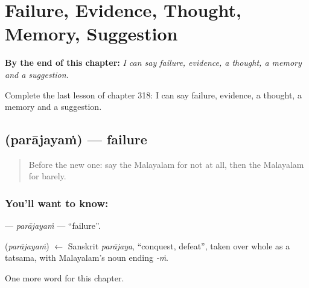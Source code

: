 
\chapter{Failure, Evidence, Thought, Memory, Suggestion}
\label{ch:ml-failure-evidence-thought-memory-suggestion}

\begin{chapteropening}
\textbf{By the end of this chapter:} \emph{I can say failure, evidence, a thought, a memory and a suggestion.}

Complete the last lesson of chapter 318: I can say failure, evidence, a thought, a memory and a suggestion.
\end{chapteropening}

\section[\texorpdfstring{\ml{പരാജയം} (parājayaṁ)}{പരാജയം (parājayaṁ)}]{ (parājayaṁ) — failure}

\label{lesson:ML-C318-parajayam}



\begin{quote}
Before the new one: say the Malayalam for not at all, then the Malayalam for barely.
\end{quote}

\subsection*{You'll want to know: }
\textbf{} — \emph{parājayaṁ} — \textquotedblleft{}failure\textquotedblright{}.

\begin{cousinweb}
\textbf{} (\emph{parājayaṁ}) $\leftarrow$ Sanskrit \emph{parājaya}, \textquotedblleft{}conquest, defeat\textquotedblright{}, taken over whole as a tatsama, with Malayalam's noun ending \emph{-ṁ}.
\end{cousinweb}

\begin{grammarlens}[title={What you've built}]
One more word for this chapter.
\end{grammarlens}

